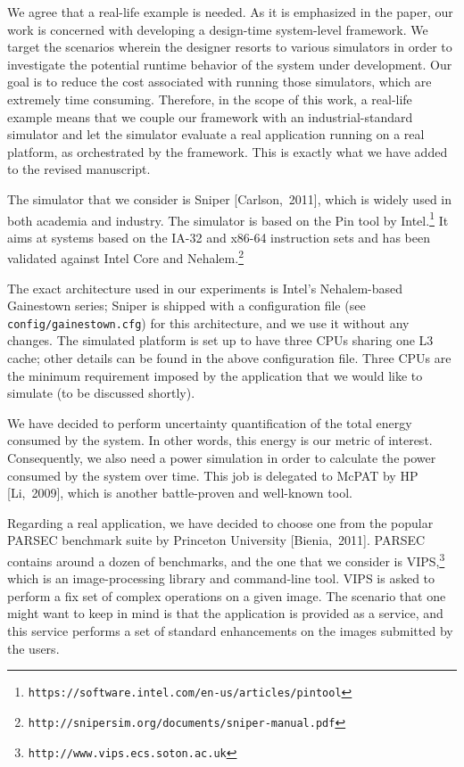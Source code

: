 \begin{authors}
We agree that a real-life example is needed. As it is emphasized in the paper,
our work is concerned with developing a design-time system-level framework. We
target the scenarios wherein the designer resorts to various simulators in order
to investigate the potential runtime behavior of the system under development.
Our goal is to reduce the cost associated with running those simulators, which
are extremely time consuming. Therefore, in the scope of this work, a real-life
example means that we couple our framework with an industrial-standard simulator
and let the simulator evaluate a real application running on a real platform, as
orchestrated by the framework. This is exactly what we have added to the revised
manuscript.

The simulator that we consider is Sniper [Carlson,~2011], which is widely used
in both academia and industry. The simulator is based on the Pin tool by
Intel.\footnote{\texttt{https://software.intel.com/en-us/articles/pintool}} It
aims at systems based on the IA-32 and x86-64 instruction sets and has been
validated against Intel Core and
Nehalem.\footnote{\texttt{http://snipersim.org/documents/sniper-manual.pdf}}

The exact architecture used in our experiments is Intel's Nehalem-based
Gainestown series; Sniper is shipped with a configuration file (see
\texttt{config/gainestown.cfg}) for this architecture, and we use it without any
changes. The simulated platform is set up to have three CPUs sharing one L3
cache; other details can be found in the above configuration file. Three CPUs
are the minimum requirement imposed by the application that we would like to
simulate (to be discussed shortly).

We have decided to perform uncertainty quantification of the total energy
consumed by the system. In other words, this energy is our metric of interest.
Consequently, we also need a power simulation in order to calculate the power
consumed by the system over time. This job is delegated to McPAT by HP
[Li,~2009], which is another battle-proven and well-known tool.

Regarding a real application, we have decided to choose one from the popular
PARSEC benchmark suite by Princeton University [Bienia,~2011]. PARSEC contains
around a dozen of benchmarks, and the one that we consider is
VIPS,\footnote{\texttt{http://www.vips.ecs.soton.ac.uk}} which is an
image-processing library and command-line tool. VIPS is asked to perform a fix
set of complex operations on a given image. The scenario that one might want to
keep in mind is that the application is provided as a service, and this service
performs a set of standard enhancements on the images submitted by the users.


\end{authors}
